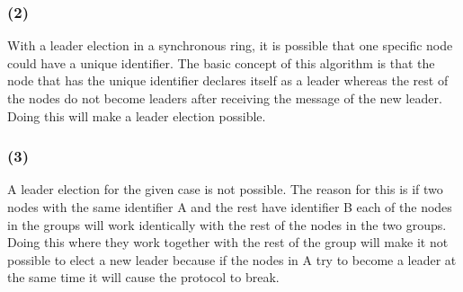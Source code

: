 \documentclass{article}
\begin{document}
\subsubsection*{(2)}
With a leader election in a synchronous ring, it is possible that one specific node could have a unique identifier. The basic concept of this algorithm is that the node that has the unique identifier declares itself as a leader whereas the rest of the nodes do not become leaders after receiving the message of the new leader. Doing this will make a leader election possible.


\subsubsection*{(3)}
A leader election for the given case is not possible. The reason for this is if two nodes with the same identifier A and the rest have identifier B each of the nodes in the groups will work identically with the rest of the nodes in the two groups. Doing this where they work together with the rest of the group will make it not possible to elect a new leader because if the nodes in A try to become a leader at the same time it will cause the protocol to break.


\newpage
\printbibliography
\end{document}
